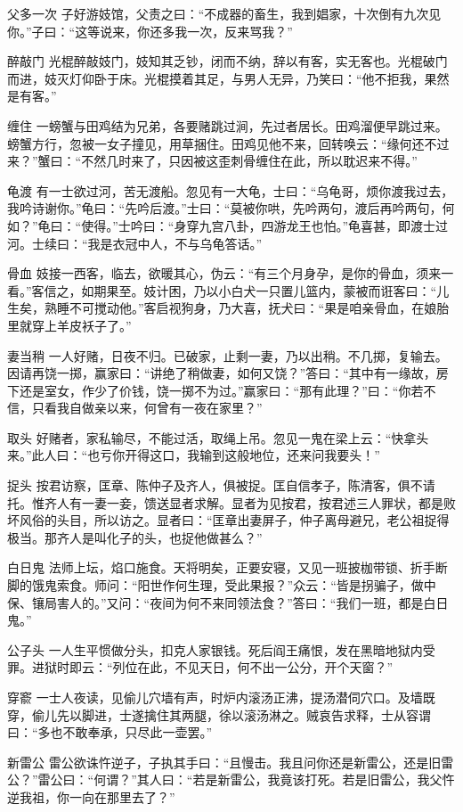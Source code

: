 \documentclass[12pt,UTF8]{ctexbook}
\begin{document}
父多一次
子好游妓馆，父责之曰：“不成器的畜生，我到娼家，十次倒有九次见你。”子曰：“这等说来，你还多我一次，反来骂我？”

醉敲门
光棍醉敲妓门，妓知其乏钞，闭而不纳，辞以有客，实无客也。光棍破门而进，妓灭灯仰卧于床。光棍摸着其足，与男人无异，乃笑曰：“他不拒我，果然是有客。”

缠住
一螃蟹与田鸡结为兄弟，各要赌跳过涧，先过者居长。田鸡溜便早跳过来。螃蟹方行，忽被一女子撞见，用草捆住。田鸡见他不来，回转唤云：“缘何还不过来？”蟹曰：“不然几时来了，只因被这歪刺骨缠住在此，所以耽迟来不得。”

龟渡
有一士欲过河，苦无渡船。忽见有一大龟，士曰：“乌龟哥，烦你渡我过去，我吟诗谢你。”龟曰：“先吟后渡。”士曰：“莫被你哄，先吟两句，渡后再吟两句，何如？”龟曰：“使得。”士吟曰：“身穿九宫八卦，四游龙王也怕。”龟喜甚，即渡士过河。士续曰：“我是衣冠中人，不与乌龟答话。”

骨血
妓接一西客，临去，欲暖其心，伪云：“有三个月身孕，是你的骨血，须来一看。”客信之，如期果至。妓计困，乃以小白犬一只置儿篮内，蒙被而诳客曰：“儿生矣，熟睡不可搅动他。”客启视狗身，乃大喜，抚犬曰：“果是咱亲骨血，在娘胎里就穿上羊皮袄子了。”

妻当稍
一人好赌，日夜不归。已破家，止剩一妻，乃以出稍。不几掷，复输去。因请再饶一掷，赢家曰：“讲绝了稍做妻，如何又饶？”答曰：“其中有一缘故，房下还是室女，作少了价钱，饶一掷不为过。”赢家曰：“那有此理？”曰：“你若不信，只看我自做亲以来，何曾有一夜在家里？”

取头
好赌者，家私输尽，不能过活，取绳上吊。忽见一鬼在梁上云：“快拿头来。”此人曰：“也亏你开得这口，我输到这般地位，还来问我要头！”

捉头
按君访察，匡章、陈仲子及齐人，俱被捉。匡自信孝子，陈清客，俱不请托。惟齐人有一妻一妾，馈送显者求解。显者为见按君，按君述三人罪状，都是败坏风俗的头目，所以访之。显者曰：“匡章出妻屏子，仲子离母避兄，老公祖捉得极当。那齐人是叫化子的头，也捉他做甚么？”

白日鬼
法师上坛，焰口施食。天将明矣，正要安寝，又见一班披枷带锁、折手断脚的饿鬼索食。师问：“阳世作何生理，受此果报？”众云：“皆是拐骗子，做中保、镶局害人的。”又问：“夜间为何不来同领法食？”答曰：“我们一班，都是白日鬼。”

公子头
一人生平惯做分头，扣克人家银钱。死后阎王痛恨，发在黑暗地狱内受罪。进狱时即云：“列位在此，不见天日，何不出一公分，开个天窗？”

穿窬
一士人夜读，见偷儿穴墙有声，时炉内滚汤正沸，提汤潜伺穴口。及墙既穿，偷儿先以脚进，士遂擒住其两腿，徐以滚汤淋之。贼哀告求释，士从容谓曰：“多也不敢奉承，只尽此一壶罢。”

新雷公
雷公欲诛忤逆子，子执其手曰：“且慢击。我且问你还是新雷公，还是旧雷公？”雷公曰：“何谓？”其人曰：“若是新雷公，我竟该打死。若是旧雷公，我父忤逆我祖，你一向在那里去了？”
\end{document}
